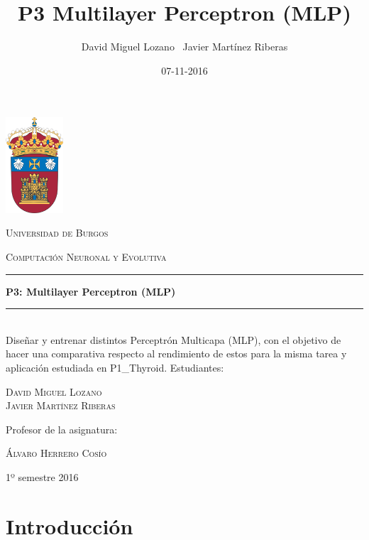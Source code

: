 \documentclass[a4paper,12pt,titlepage]{article}
\newcommand{\HRule}[1]{\rule{\linewidth}{#1}}
\begin{document}
\author{David Miguel Lozano \ Javier Martínez Riberas}
\title{P3 Multilayer Perceptron (MLP)}
\date{07-11-2016}

\begin{titlepage}
	\centering
	\includegraphics[width=0.16\textwidth]{ubu-logo.png}\par
	\vspace{0.3cm}
	{\scshape\LARGE Universidad de Burgos \par}
	\vfill
	{\scshape\Large Computación Neuronal y Evolutiva \par}
	\HRule{2pt}
	{\huge\bfseries P3: Multilayer Perceptron (MLP) \par}
	\HRule{2pt}
	\\ [0.5cm]
	{Diseñar y entrenar distintos Perceptrón Multicapa (MLP), con el objetivo de hacer una comparativa respecto al rendimiento de estos para la misma tarea y aplicación estudiada en P1\_Thyroid.}
	\vfill
	Estudiantes:\par
	{\Large\scshape David Miguel Lozano \\ Javier Martínez Riberas \par}
	\vfill
	Profesor de la asignatura:\par
	\textsc{Álvaro Herrero Cosío}
	\vfill
	{\large 1º semestre 2016 \par}
\end{titlepage}

\newpage
\tableofcontents
\begin{appendix}
\end{appendix}

\newpage

\section{Introducción}
\end{document}
